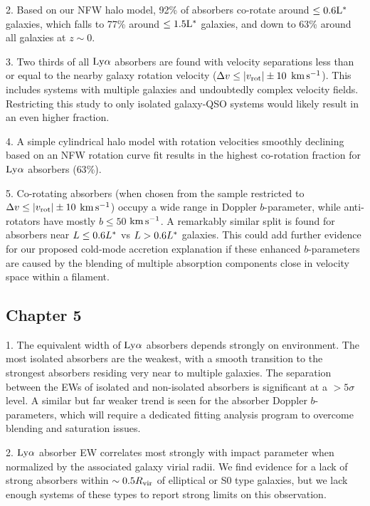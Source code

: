 \documentclass[twocolumn,tighten]{aastex62}
\newcommand{\kms}{$\rm km\, s^{-1}$}
\begin{document}
2. Based on our NFW halo model, 92\% of absorbers co-rotate around $\rm \leq 0.6 L^{\**}$ galaxies, which falls to 77\% around $\rm \leq 1.5 L^{\**}$ galaxies, and down to 63\% around all galaxies at $z \sim 0$.

3. Two thirds of all $\rm Ly\alpha$ absorbers are found with velocity separations less than or equal to the nearby galaxy rotation velocity ($\Delta v \leq \lvert v_{\rm rot} \rvert \pm 10$ \kms). This includes systems with multiple galaxies and undoubtedly complex velocity fields. Restricting this study to only isolated galaxy-QSO systems would likely result in an even higher fraction.

4. A simple cylindrical halo model with rotation velocities smoothly declining based on an NFW rotation curve fit results in the highest co-rotation fraction for $\rm Ly\alpha$ absorbers ($63\%$).

5. Co-rotating absorbers (when chosen from the sample restricted to $\Delta v \leq \lvert v_{\rm rot} \rvert \pm 10$ \kms) occupy a wide range in Doppler $b$-parameter, while anti-rotators have mostly $b \leq 50$ \kms. A remarkably similar split is found for absorbers near $L \leq 0.6 L^{\**}$ vs $L > 0.6 L^{\**}$ galaxies. This could add further evidence for our proposed cold-mode accretion explanation if these enhanced $b$-parameters are caused by the blending of multiple absorption components close in velocity space within a filament.


\subsection{Chapter 5}
1. The equivalent width of $\rm Ly\alpha$ absorbers depends strongly on environment. The most isolated absorbers are the weakest, with a smooth transition to the strongest absorbers residing very near to multiple galaxies. The separation between the EWs of isolated and non-isolated absorbers is significant at a $> 5\sigma$ level. A similar but far weaker trend is seen for the absorber Doppler $b$-parameters, which will require a dedicated fitting analysis program to overcome blending and saturation issues.

2. $\rm Ly\alpha$ absorber EW correlates most strongly with impact parameter when normalized by the associated galaxy virial radii. We find evidence for a lack of strong absorbers within $\sim 0.5 R_{\rm vir}$ of elliptical or S0 type galaxies, but we lack enough systems of these types to report strong limits on this observation.
\end{document}
